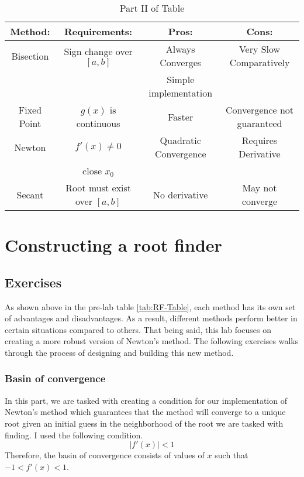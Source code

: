 \documentclass{article}
\begin{document}
\begin{table}[h!]
    \centering
    \begin{tabular}{|c|c|c|c|}
        \hline
        Method: & Requirements: & Pros: & Cons: \\
        \hline
        Bisection & Sign change over \([a,b]\) & Always Converges & Very Slow Comparatively \\
        &  & Simple implementation &  \\
        \hline
        Fixed Point & \(g(x)\) is continuous & Faster & Convergence not guaranteed \\
        \hline
        Newton & \(f'(x) \neq 0\) & Quadratic Convergence & Requires Derivative \\
        & close \(x_0\) &  &  \\
        \hline
        Secant & Root must exist over \([a,b]\) & No derivative & May not converge \\
        \hline
    \end{tabular}
    \caption{Part II of Table}
    \label{tab:RF-Table2}
\end{table}

\section{Constructing a root finder}
\subsection{Exercises}
As shown above in the pre-lab table \ref{tab:RF-Table}, each method has its own set of advantages and disadvantages. As a result, different methods perform better in certain situations compared to others. That being said, this lab focuses on creating a more robust version of Newton's method. The following exercises walks through the process of designing and building this new method.

\subsubsection{Basin of convergence}
In this part, we are tasked with creating a condition for our implementation of Newton's method which guarantees that the method will converge to a unique root given an initial guess in the neighborhood of the root we are tasked with finding. I used the following condition.
\[
|f'(x)| < 1
\]
Therefore, the basin of convergence consists of values of \(x\) such that \(-1<f'(x)<1\).
\end{document}
